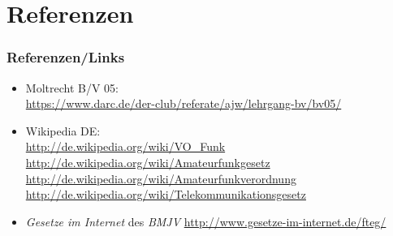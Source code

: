 \section{Referenzen}

\begin{frame}
  \frametitle{Referenzen/Links}

  \footnotesize
  \begin{itemize}
    \item Moltrecht B/V 05: \\
      \url{https://www.darc.de/der-club/referate/ajw/lehrgang-bv/bv05/}
    \item Wikipedia DE: \\
      \url{http://de.wikipedia.org/wiki/VO\_Funk} \\
      \url{http://de.wikipedia.org/wiki/Amateurfunkgesetz}
      \url{http://de.wikipedia.org/wiki/Amateurfunkverordnung}
      \url{http://de.wikipedia.org/wiki/Telekommunikationsgesetz}
    \item \emph{Gesetze im Internet} des \emph{BMJV}
      \url{http://www.gesetze-im-internet.de/fteg/}
  \end{itemize}

\end{frame}


